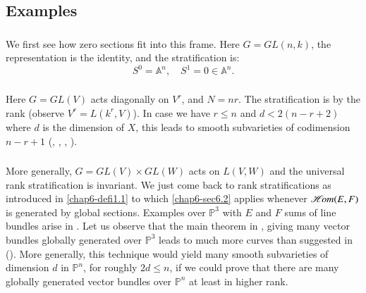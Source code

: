 \subsection{Examples}\label{chap6-sec6.3}

\subsubsection{}\label{chap6-sec6.3.1}
We first see how zero sections fit into this frame. Here $G=GL(n,k)$,
the representation is the identity, and the stratification is:
$$
S^{0}=\mathbb{A}^{n},\quad S^{1}=0\in \mathbb{A}^{n}.
$$\pageoriginale

\subsubsection{}\label{chap6-sec6.3.2}

Here $G=GL(V)$ acts diagonally on $V^{r}$, and $N=nr$. The
stratification is by the rank (observe $V^{r}=L(k^{r},V)$). In case we
have $r\leq n$ and $d<2(n-r+2)$ where $d$ is the dimension of $X$,
this leads to smooth subvarieties of codimension $n-r+1$
(\cite{chap6-Vo}, \cite{chap6-Ra2}, \cite{chap6-Sch}, \cite{chap6-HeS}).

\subsubsection{}\label{chap6-sec6.3.3}

More generally, $G=GL(V)\times GL(W)$ acts on $L(V,W)$ and the
universal rank stratification is invariant. We just come back to rank
stratifications as introduced in \ref{chap6-defi1.1} to
which \ref{chap6-sec6.2} applies whenever $\operatorname{\it\mathscr{H}\!om}(E,F)$ is generated
by global sections. Examples over $\mathbb{P}^{3}$ with $E$ and $F$
sums of line bundles arise in \cite{chap6-E11}. Let us observe that
the main theorem in \cite{chap6-HH2}, giving many vector bundles
globally generated over $\mathbb{P}^{3}$ leads to much more curves
than suggested in (\cite[p.~365]{chap6-HH2}). More generally, this technique
would yield many smooth subvarieties of dimension $d$ in
$\mathbb{P}^{n}$, for roughly $2d\leq n$, if we could prove that there
are many globally generated vector bundles over $\mathbb{P}^{n}$ at
least in higher rank.

\subsubsection{}\label{chap6-sec6.3.4}

